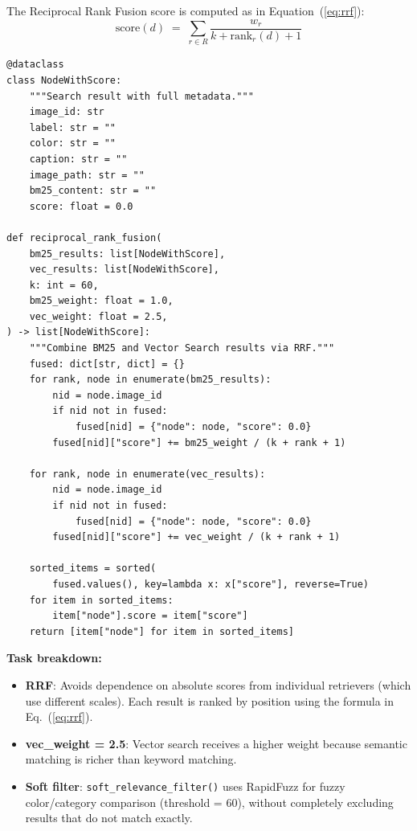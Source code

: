 \documentclass[12pt, twoside]{report}
\begin{document}
The Reciprocal Rank Fusion score is computed as in Equation~(\ref{eq:rrf}):
\begin{equation}
\label{eq:rrf}
\text{score}(d) \;=\; \sum_{r \in R} \frac{w_r}{k + \text{rank}_r(d) + 1}
\end{equation}

\begin{lstlisting}[caption={Reciprocal Rank Fusion --- search/fusion.py}]
@dataclass
class NodeWithScore:
    """Search result with full metadata."""
    image_id: str
    label: str = ""
    color: str = ""
    caption: str = ""
    image_path: str = ""
    bm25_content: str = ""
    score: float = 0.0

def reciprocal_rank_fusion(
    bm25_results: list[NodeWithScore],
    vec_results: list[NodeWithScore],
    k: int = 60,
    bm25_weight: float = 1.0,
    vec_weight: float = 2.5,
) -> list[NodeWithScore]:
    """Combine BM25 and Vector Search results via RRF."""
    fused: dict[str, dict] = {}
    for rank, node in enumerate(bm25_results):
        nid = node.image_id
        if nid not in fused:
            fused[nid] = {"node": node, "score": 0.0}
        fused[nid]["score"] += bm25_weight / (k + rank + 1)

    for rank, node in enumerate(vec_results):
        nid = node.image_id
        if nid not in fused:
            fused[nid] = {"node": node, "score": 0.0}
        fused[nid]["score"] += vec_weight / (k + rank + 1)

    sorted_items = sorted(
        fused.values(), key=lambda x: x["score"], reverse=True)
    for item in sorted_items:
        item["node"].score = item["score"]
    return [item["node"] for item in sorted_items]
\end{lstlisting}

\textbf{Task breakdown:}
\begin{itemize}
    \item \textbf{RRF}: Avoids dependence on absolute scores from individual retrievers (which use different scales). Each result is ranked by position using the formula in Eq.~(\ref{eq:rrf}).
    \item \textbf{vec\_weight = 2.5}: Vector search receives a higher weight because semantic matching is richer than keyword matching.
    \item \textbf{Soft filter}: \texttt{soft\_relevance\_filter()} uses RapidFuzz for fuzzy color/category comparison (threshold = 60), without completely excluding results that do not match exactly.
\end{itemize}
\end{document}
